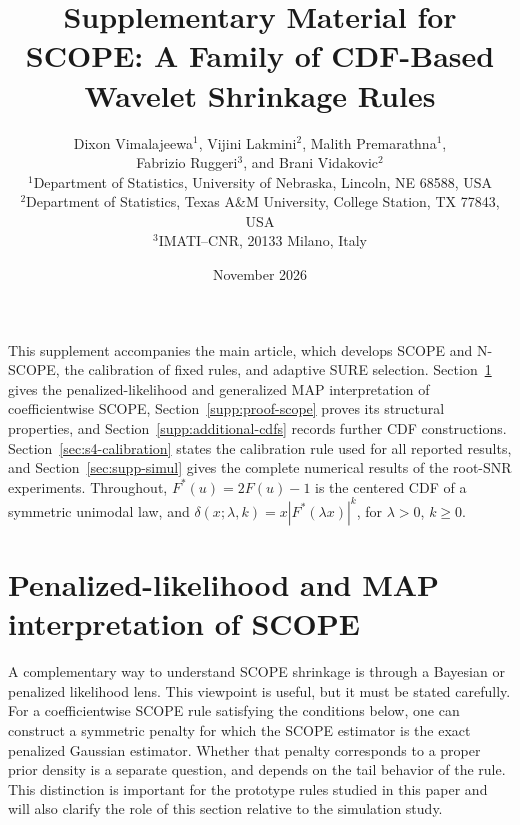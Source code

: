 \documentclass[11pt]{article}
\numberwithin{equation}{section}
\begin{document}
\title{Supplementary Material for\\
SCOPE: A Family of CDF-Based Wavelet Shrinkage Rules}
\author{Dixon Vimalajeewa$^{1}$, Vijini Lakmini$^{2}$, Malith Premarathna$^{1}$,\\
Fabrizio Ruggeri$^{3}$, and Brani Vidakovic$^{2}$\\[6pt]
{\small $^{1}$Department of Statistics, University of Nebraska, Lincoln, NE 68588, USA}\\
{\small $^{2}$Department of Statistics, Texas A\&M University, College Station, TX 77843, USA}\\
{\small $^{3}$IMATI--CNR, 20133 Milano, Italy}}
\date{November 2026}
\maketitle

\noindent
This supplement accompanies the main article, which develops SCOPE and
N-SCOPE, the calibration of fixed rules, and adaptive SURE selection.
Section~\ref{sec:Bayes} gives the penalized-likelihood and generalized
MAP interpretation of coefficientwise SCOPE,
Section~\ref{supp:proof-scope} proves its structural properties, and
Section~\ref{supp:additional-cdfs} records further CDF constructions.
Section~\ref{sec:s4-calibration} states the calibration rule used for
all reported results, and Section~\ref{sec:supp-simul} gives the complete
numerical results of the root-SNR experiments. Throughout,
$F^*(u)=2F(u)-1$ is the centered CDF of a symmetric unimodal law, and
$\delta(x;\lambda,k)=x|F^*(\lambda x)|^k$, for $\lambda>0$, $k\geq0$.


\section{Penalized-likelihood and MAP interpretation of SCOPE}
\label{sec:Bayes}

A complementary way to understand SCOPE shrinkage is through a Bayesian or penalized likelihood lens. This viewpoint is useful, but it must be stated carefully. For a coefficientwise SCOPE rule satisfying the conditions below, one can construct a symmetric penalty for which the SCOPE estimator is the exact penalized Gaussian estimator. Whether that penalty corresponds to a proper prior density is a separate question, and depends on the tail behavior of the rule. This distinction is important for the prototype rules studied in this paper and will also clarify the role of this section relative to the simulation study.
\end{document}
